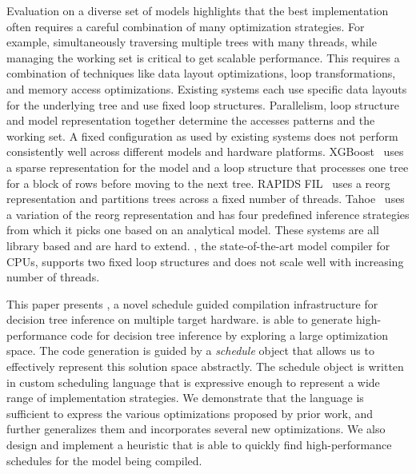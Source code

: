 Evaluation on a diverse set of models highlights that the best implementation often requires a careful combination 
of many optimization strategies. For example, simultaneously traversing multiple trees with many threads, while managing the working set is 
critical to get scalable performance. This requires a combination of techniques like data layout optimizations, 
loop transformations, and memory access optimizations. Existing systems each use specific data layouts for the underlying
tree and use fixed loop structures. 
Parallelism, loop structure and model representation together determine the accesses patterns and the working set. A fixed configuration 
as used by existing systems does not perform consistently well across different models and hardware platforms.
XGBoost~\cite{XGBoost} uses a sparse representation for the model and a loop structure that processes one tree for a block of rows before moving to 
the next tree. RAPIDS FIL~\cite{FIL} uses a reorg representation and partitions trees across a fixed number of threads. Tahoe~\cite{Tahoe} uses a
variation of the reorg representation and has four predefined inference strategies from which it picks one based on an analytical model.
These systems are all library based and are hard to extend. 
\TreebeardOLD{}, the state-of-the-art model compiler for CPUs, supports two fixed loop structures and does not scale well with increasing number of threads.

This paper presents \Treebeard{}, a novel schedule guided compilation infrastructure for decision tree inference on multiple target hardware. \Treebeard{} is able to generate high-performance code for decision tree inference by exploring a large optimization space. The code generation is guided by a \emph{schedule} object that allows us to effectively represent this solution space abstractly. The schedule object is written in \Treebeard{} custom scheduling language that is expressive enough to represent a wide range of implementation strategies. We demonstrate that the language is sufficient to express the various optimizations proposed by prior work, and further generalizes them and incorporates several new optimizations. We also design and implement a heuristic that is able to quickly find high-performance schedules for the model being compiled.
